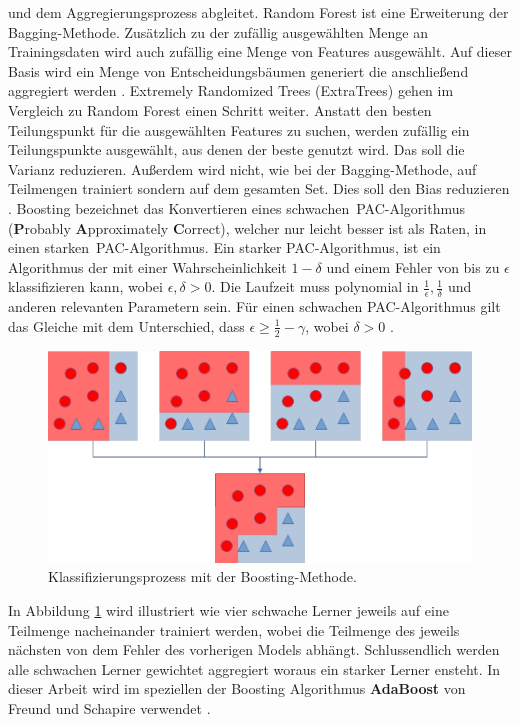 und dem Aggregierungsprozess abgleitet.
\newline
\newline
Random Forest ist eine Erweiterung der Bagging-Methode. Zusätzlich zu der zufällig ausgewählten Menge an Trainingsdaten wird auch zufällig eine Menge von Features ausgewählt. Auf dieser Basis wird ein Menge von
Entscheidungsbäumen generiert die anschließend aggregiert werden \cite{breiman2001random}.
\newline
\newline
Extremely Randomized Trees (ExtraTrees) gehen im Vergleich zu Random Forest einen Schritt weiter. Anstatt den besten Teilungspunkt für die ausgewählten Features zu suchen, werden zufällig ein Teilungspunkte ausgewählt, aus denen
der beste genutzt wird. Das soll die Varianz reduzieren. Außerdem wird nicht, wie bei der Bagging-Methode, auf Teilmengen trainiert sondern auf dem gesamten Set. Dies soll den Bias reduzieren \cite{geurts2006extremely}.
\newline
\newline
Boosting bezeichnet das Konvertieren eines \glqq schwachen\grqq\ PAC-Algorithmus (\textbf{P}robably \textbf{A}pproximately \textbf{C}orrect), welcher nur leicht besser ist als Raten, in einen \glqq starken\grqq\
PAC-Algorithmus. Ein starker PAC-Algorithmus, ist ein Algorithmus der mit einer Wahrscheinlichkeit $1 - \delta$ und einem Fehler von bis zu $\epsilon$ klassifizieren kann, wobei $\epsilon, \delta > 0$. Die
Laufzeit muss polynomial in $\frac{1}{\epsilon}, \frac{1}{\delta}$ und anderen relevanten Parametern sein. Für einen schwachen PAC-Algorithmus gilt das Gleiche
mit dem Unterschied, dass $\epsilon \geq \frac{1}{2} - \gamma$, wobei $\delta > 0$ \cite{freund1997decision}.
\newpage
\begin{figure}
    \centering
    \includegraphics[width=\linewidth]{images/boosting.jpg}
    \caption{Klassifizierungsprozess mit der Boosting-Methode.}
    \label{fig:boosting}
\end{figure}
In Abbildung \ref{fig:boosting} wird illustriert wie vier schwache Lerner jeweils auf eine Teilmenge nacheinander trainiert werden, wobei die Teilmenge des jeweils nächsten von dem Fehler des vorherigen Models
abhängt. Schlussendlich werden alle schwachen Lerner gewichtet aggregiert woraus ein starker Lerner ensteht. In dieser Arbeit wird im speziellen der Boosting Algorithmus \textbf{AdaBoost} von Freund
und Schapire verwendet \cite{freund1997decision}.